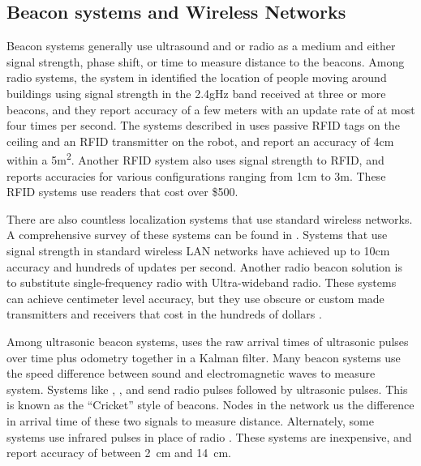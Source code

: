 \documentclass{article}
\begin{document}
  \subsection{Beacon systems and Wireless Networks} \label{section:beacons_background}

    Beacon systems generally use ultrasound and or radio as a medium and either signal strength, phase shift, or time to measure distance to the beacons. Among radio systems, the system in \cite{bahl_radar:_2000} identified the location of people moving around buildings using signal strength in the 2.4gHz band received at three or more beacons, and they report accuracy of a few meters with an update rate of at most four times per second. The systems described in \cite{digiampaolo_mobile_2014} uses passive RFID tags on the ceiling and an RFID transmitter on the robot, and report an accuracy of 4\si{\centi\meter} within a 5\si{\square\meter}. Another RFID system \cite{saab_standalone_2011} also uses signal strength to RFID, and reports accuracies for various configurations ranging from 1\si{\centi\meter} to 3\si{\meter}. These RFID systems use readers that cost over \$500.

    There are also countless localization systems that use standard wireless networks. A comprehensive survey of these systems can be found in \cite{liu_survey_2007}. Systems that use signal strength in standard wireless LAN networks have achieved up to 10\si{\centi\meter} accuracy and hundreds of updates per second. Another radio beacon solution is to substitute single-frequency radio with Ultra-wideband radio. These systems can achieve centimeter level accuracy, but they use obscure or custom made transmitters and receivers that cost in the hundreds of dollars \cite{zebra_dart_2017} \cite{pozyx_pozyx_2017}.

    Among ultrasonic beacon systems, \cite{kleeman_optimal_1992} uses the raw arrival times of ultrasonic pulses over time plus odometry together in a Kalman filter. Many beacon systems use the speed difference between sound and electromagnetic waves to measure system. Systems like \cite{smith_tracking_2004}, \cite{ward_new_1997}, and \cite{kim_advanced_2008} send radio pulses followed by ultrasonic pulses. This is known as the ``Cricket'' style of beacons. Nodes in the network us the difference in arrival time of these two signals to measure distance. Alternately, some systems use infrared pulses in place of radio \cite{ghidary_new_1999} \cite{yucel_development_2012}. These systems are inexpensive, and report accuracy of between \SI{2}{\centi\meter} and \SI{14}{\centi\meter}.
\end{document}
